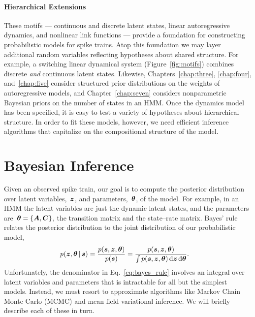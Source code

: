 
\paragraph{Hierarchical Extensions}
These motifs --- continuous and discrete latent states, linear autoregressive 
dynamics, and nonlinear link functions --- provide a foundation for 
constructing probabilistic models for spike trains. Atop this foundation 
we may layer additional random variables reflecting hypotheses about shared 
structure. For example, a switching linear dynamical system (Figure~\ref{fig:motifs})
combines discrete \emph{and} continuous latent states. 
Likewise, Chapters~\ref{chap:three}, \ref{chap:four},
and~\ref{chap:five} consider structured prior distributions on 
the weights of autoregressive models, and Chapter~\ref{chap:seven} considers 
nonparametric Bayesian priors on the number of states in an HMM. Once the 
dynamics model has been specified, it is easy to test a variety of hypotheses
about hierarchical structure. In order to fit these models, however, we need 
efficient inference algorithms that capitalize on the compositional structure 
of the model.



\section{Bayesian Inference}
\label{sec:inference_algorithms}
Given an observed spike train, our goal is to compute the posterior
distribution over latent variables,~$\boldsymbol{z}$, and parameters,~$\boldsymbol{\theta}$,
of the model.  For example, in an HMM the latent variables are just
the dynamic latent states, and the parameters
are~${\boldsymbol{\theta} = \{\boldsymbol{A}, \boldsymbol{C}\}}$, the transition matrix and the
state--rate matrix. Bayes' rule relates the posterior distribution to
the joint distribution of our probabilistic model,
\begin{align}
  \label{eq:bayes_rule}
  p(\boldsymbol{z}, \boldsymbol{\theta} \,|\, \boldsymbol{s}) 
  &= \frac{p(\boldsymbol{s}, \boldsymbol{z}, \boldsymbol{\theta})}{p(\boldsymbol{s})} 
   = \frac{p(\boldsymbol{s}, \boldsymbol{z}, \boldsymbol{\theta})}{\int p(\boldsymbol{s}, \boldsymbol{z}, \boldsymbol{\theta}) \, \mathrm{d}\boldsymbol{z} \, \mathrm{d}\boldsymbol{\theta}} .
\end{align}
Unfortunately, the denominator in Eq.~\ref{eq:bayes_rule} involves an 
integral over latent variables and parameters that is intractable for 
all but the simplest models. Instead, we must resort to approximate 
algorithms like Markov Chain Monte Carlo (MCMC) and mean field variational 
inference. We will briefly describe each of these in turn.

